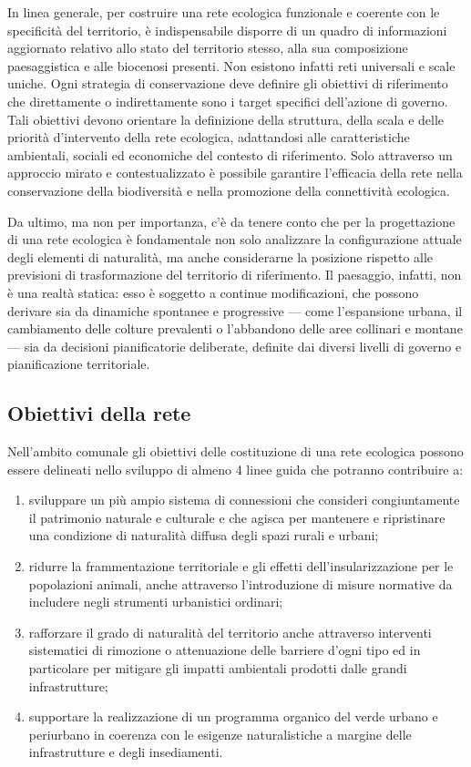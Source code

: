 \documentclass[
]{book}
\providecommand{\tightlist}{%
  \setlength{\itemsep}{0pt}\setlength{\parskip}{0pt}}
\begin{document}
In linea generale, per costruire una rete ecologica funzionale e
coerente con le specificità del territorio, è indispensabile disporre di
un quadro di informazioni aggiornato relativo allo stato del territorio
stesso, alla sua composizione paesaggistica e alle biocenosi presenti.
Non esistono infatti reti universali e scale uniche. Ogni strategia di
conservazione deve definire gli obiettivi di riferimento che
direttamente o indirettamente sono i target specifici dell'azione di
governo. Tali obiettivi devono orientare la definizione della struttura,
della scala e delle priorità d'intervento della rete ecologica,
adattandosi alle caratteristiche ambientali, sociali ed economiche del
contesto di riferimento. Solo attraverso un approccio mirato e
contestualizzato è possibile garantire l'efficacia della rete nella
conservazione della biodiversità e nella promozione della connettività
ecologica.

Da ultimo, ma non per importanza, c'è da tenere conto che per la
progettazione di una rete ecologica è fondamentale non solo analizzare
la configurazione attuale degli elementi di naturalità, ma anche
considerarne la posizione rispetto alle previsioni di trasformazione del
territorio di riferimento. Il paesaggio, infatti, non è una realtà
statica: esso è soggetto a continue modificazioni, che possono derivare
sia da dinamiche spontanee e progressive --- come l'espansione urbana, il
cambiamento delle colture prevalenti o l'abbandono delle aree collinari
e montane --- sia da decisioni pianificatorie deliberate, definite dai
diversi livelli di governo e pianificazione territoriale.

\subsection{Obiettivi della rete}\label{obiettivi-della-rete}

Nell'ambito comunale gli obiettivi delle costituzione di una rete
ecologica possono essere delineati nello sviluppo di almeno 4 linee
guida che potranno contribuire a:

\begin{enumerate}
\def\labelenumi{\arabic{enumi}.}
\tightlist
\item
  sviluppare un più ampio sistema di connessioni che consideri
  congiuntamente il patrimonio naturale e culturale e che agisca per
  mantenere e ripristinare una condizione di naturalità diffusa degli
  spazi rurali e urbani;
\item
  ridurre la frammentazione territoriale e gli effetti
  dell'insularizzazione per le popolazioni animali, anche attraverso
  l'introduzione di misure normative da includere negli strumenti
  urbanistici ordinari;
\item
  rafforzare il grado di naturalità del territorio anche attraverso
  interventi sistematici di rimozione o attenuazione delle barriere
  d'ogni tipo ed in particolare per mitigare gli impatti ambientali
  prodotti dalle grandi infrastrutture;
\item
  supportare la realizzazione di un programma organico del verde
  urbano e periurbano in coerenza con le esigenze naturalistiche a
  margine delle infrastrutture e degli insediamenti.
\end{enumerate}
\end{document}
